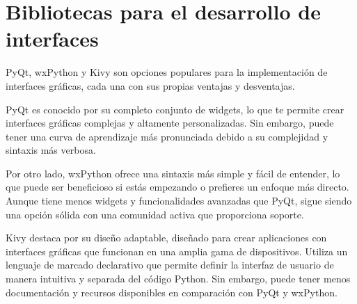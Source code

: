 \section{Bibliotecas para el desarrollo de interfaces}

PyQt, wxPython y Kivy son opciones populares para la implementación de interfaces gráficas, cada una con sus propias ventajas y desventajas.

PyQt es conocido por su completo conjunto de widgets, lo que te permite crear interfaces gráficas complejas y altamente personalizadas. Sin embargo, puede tener una curva de aprendizaje más pronunciada debido a su complejidad y sintaxis más verbosa.

Por otro lado, wxPython ofrece una sintaxis más simple y fácil de entender, lo que puede ser beneficioso si estás empezando o prefieres un enfoque más directo. Aunque tiene menos widgets y funcionalidades avanzadas que PyQt, sigue siendo una opción sólida con una comunidad activa que proporciona soporte.

Kivy destaca por su diseño adaptable, diseñado para crear aplicaciones con interfaces gráficas que funcionan en una amplia gama de dispositivos. Utiliza un lenguaje de marcado declarativo que permite definir la interfaz de usuario de manera intuitiva y separada del código Python. Sin embargo, puede tener menos documentación y recursos disponibles en comparación con PyQt y wxPython.







